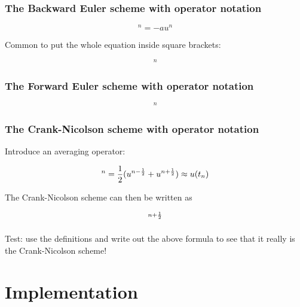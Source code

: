 \documentclass{beamer}
\begin{document}
\begin{frame}
\frametitle{The Backward Euler scheme with operator notation}

\begin{equation*}
[D_t^-u]^n = -au^n
\end{equation*}

Common to put the whole equation inside square brackets:

\begin{equation}
[D_t^- u  = -au]^n
\end{equation}
\end{frame}

\begin{frame}
\frametitle{The Forward Euler scheme with operator notation}

\begin{equation}
[D_t^+ u  = -au]^n
\end{equation}
\end{frame}

\begin{frame}
\frametitle{The Crank-Nicolson scheme with operator notation}

Introduce an averaging operator:

\begin{equation}
[\overline{u}^{t}]^n = \half (u^{n-\half} + u^{n+\half} )
\approx u(t_n) \label{fd:mean:a}
\end{equation}

The Crank-Nicolson scheme can then be written as

\begin{equation}
[D_t u = -a\overline{u}^t]^{n+\half}
\label{fd:compact:ex:CN}
\end{equation}

Test: use the definitions and write out the above formula to see that
it really is the Crank-Nicolson scheme!
\end{frame}

\section{Implementation}
\end{document}
